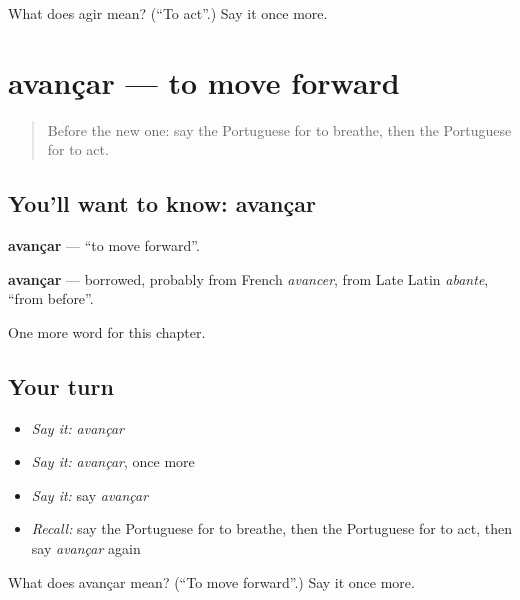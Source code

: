 \begin{tcolorbox}[breakable,colback=teal!4,colframe=teal!35!black,title={Before you move on}]
What does agir mean? (\textquotedblleft{}To act\textquotedblright{}.) Say it once more.
\end{tcolorbox}
\section[avançar]{avançar — to move forward}

\label{lesson:PT-C179-avancar}



\begin{quote}
Before the new one: say the Portuguese for to breathe, then the Portuguese for to act.
\end{quote}

\subsection*{You'll want to know: avançar}
\textbf{avançar} — \textquotedblleft{}to move forward\textquotedblright{}.

\begin{cousinweb}
\textbf{avançar} — borrowed, probably from French \emph{avancer}, from Late Latin \emph{abante}, \textquotedblleft{}from before\textquotedblright{}.
\end{cousinweb}

\begin{grammarlens}[title={What you've built}]
One more word for this chapter.
\end{grammarlens}

\subsection*{Your turn}
\begin{itemize}
\raggedright
  \item \emph{Say it:} \emph{avançar}
  \item \emph{Say it:} \emph{avançar}, once more
  \item \emph{Say it:} say \emph{avançar}
  \item \emph{Recall:} say the Portuguese for to breathe, then the Portuguese for to act, then say \emph{avançar} again
\end{itemize}

\begin{tcolorbox}[breakable,colback=teal!4,colframe=teal!35!black,title={Before you move on}]
What does avançar mean? (\textquotedblleft{}To move forward\textquotedblright{}.) Say it once more.
\end{tcolorbox}
